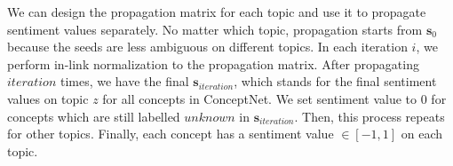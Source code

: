 We can design the propagation matrix for each topic and use it to propagate sentiment values separately. No matter which topic, propagation starts from $\boldsymbol{s}_0$ because the seeds are less ambiguous on different topics. In each iteration $i$, we perform in-link normalization to the propagation matrix. After propagating $iteration$ times, we have the final $\boldsymbol{s}_{iteration}$, which stands for the final sentiment values on topic $z$ for all concepts in ConceptNet. We set sentiment value to $0$ for concepts which are still labelled $unknown$ in $\boldsymbol{s}_{iteration}$. Then, this process repeats for other topics. Finally, each concept has a sentiment value $\in [-1,1]$ on each topic.
